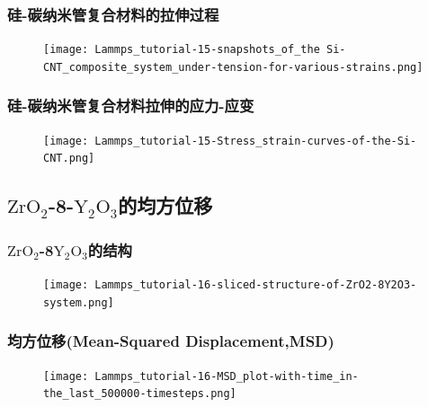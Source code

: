 \frame
{
	\frametitle{硅-碳纳米管复合材料的拉伸过程}
\begin{figure}[h!]
\centering
\vskip -10pt
\texttt{[image: Lammps\_tutorial-15-snapshots\_of\_the Si-CNT\_composite\_system\_under-tension-for-various-strains.png]}
\caption{\fontsize{6.2pt}{5.2pt}}%
\label{LAMMPS_Si_CNT-under-tension}
\end{figure}
}

\frame
{
	\frametitle{硅-碳纳米管复合材料拉伸的应力-应变}
\begin{figure}[h!]
\centering
\vskip -5pt
\texttt{[image: Lammps\_tutorial-15-Stress\_strain-curves-of-the-Si-CNT.png]}
\caption{\fontsize{6.2pt}{5.2pt}}%
\label{LAMMPS_Stress-train-curve}
\end{figure}
}

\subsection{$\mathrm{ZrO}_2$-\rm{8}-$\mathrm{Y}_2\mathrm{O}_3$的均方位移}

\frame
{
	\frametitle{$\mathrm{ZrO}_2$-\textrm{8}$\mathrm{Y}_2\mathrm{O}_3$的结构}
\begin{figure}[h!]
\centering
\vskip -5pt
\texttt{[image: Lammps\_tutorial-16-sliced-structure-of-ZrO2-8Y2O3-system.png]}
\caption{\fontsize{6.2pt}{5.2pt}}%
\label{LAMMPS_slice-structure-of-ZrO2-8Y2O3}
\end{figure}
}


\frame
{
	\frametitle{均方位移\textrm{(Mean-Squared Displacement,MSD)}}
\begin{figure}[h!]
\centering
\vskip -5pt
\texttt{[image: Lammps\_tutorial-16-MSD\_plot-with-time\_in-the\_last\_500000-timesteps.png]}
\caption{\fontsize{6.2pt}{5.2pt}}%
\label{LAMMPS_MSD-ZrO2-8Y2O3.}
\end{figure}
}

